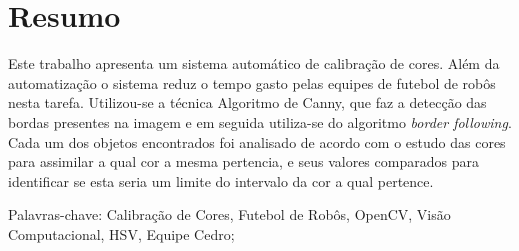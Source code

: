 
\chapter*{Resumo}

Este trabalho apresenta um sistema automático de calibração de cores. Além da automatização o sistema reduz o tempo gasto pelas equipes de futebol de robôs nesta tarefa. Utilizou-se a técnica Algoritmo de Canny, que faz a detecção das bordas presentes na imagem e em seguida utiliza-se do algoritmo {\it border following}. Cada um dos objetos encontrados foi analisado de acordo com o estudo das cores para assimilar a qual cor a mesma pertencia, e seus valores comparados para identificar se esta seria um limite do intervalo da cor a qual pertence.

Palavras-chave: Calibração de Cores, Futebol de Robôs, OpenCV, Visão Computacional, HSV, Equipe Cedro;
